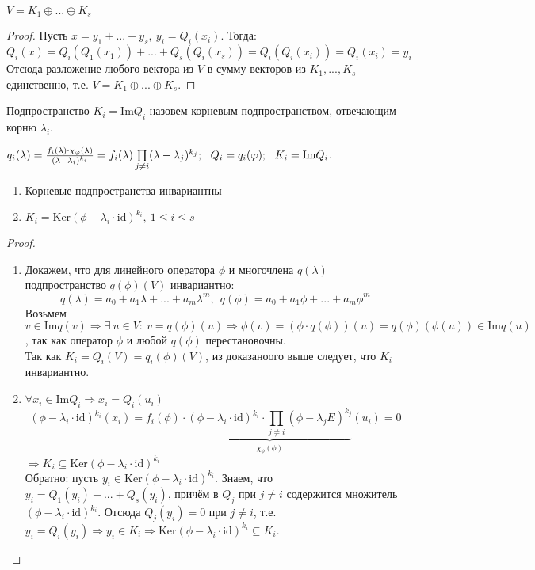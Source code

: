     \begin{subtheorem}
        $V = K_1 \oplus ... \oplus K_s$
    \end{subtheorem}
    \begin{proof}
        Пусть $x = y_1 + ... + y_s, \ y_i = Q_i(x_i)$. Тогда:
        $$Q_i(x) = Q_i(Q_1(x_1)) + ... + Q_s(Q_i(x_s)) = Q_i(Q_i(x_i)) = Q_i(x_i) = y_i$$
        Отсюда разложение любого вектора из $V$ в сумму векторов из $K_1,...,K_s$ единственно, т.е. $V = K_1 \oplus ... \oplus K_s$.
    \end{proof}
    \begin{definition}
        Подпространство $K_i = \text{Im} Q_i$ назовем корневым подпространством, отвечающим корню $\lambda_i$.
    \end{definition}
    \begin{remark}
        $q_i(\lambda) = \frac{f_i(\lambda)\cdot \chi_\phi(\lambda)}{(\lambda-\lambda_i)^{k_i}} = f_i(\lambda)\prod\limits_{j \neq i}(\lambda-\lambda_j)^{k_j}; \ \ Q_i = q_i(\phi); \ \ K_i = \textup{Im}Q_i$.
    \end{remark} 
    \begin{subtheorem}\tab
        \begin{enumerate}
            \item Корневые подпространства инвариантны
            \item $K_i = \text{Ker} (\phi - \lambda_i\cdot \text{id})^{k_i}, \ 1\leq i \leq s$ 
        \end{enumerate}
    \end{subtheorem}
    \begin{proof}\tab 
        \begin{enumerate}
            \item Докажем, что для линейного оператора $\phi$ и многочлена $q(\lambda)$ подпространство $q(\phi)(V)$ инвариантно:
            $$q(\lambda) = a_0+ a_1 \lambda + ... + a_m \lambda^m, \ \ q(\phi) = a_0+ a_1 \phi + ... + a_m \phi^m$$
            Возьмем $v \in \text{Im}q(v) \Longrightarrow \exists \ u \in V: \ v = q(\phi)(u) \Longrightarrow \phi(v) = (\phi \cdot q(\phi))(u) = q(\phi)(\phi(u)) \in \text{Im}q(u)$, так как оператор $\phi$ и любой $q(\phi)$ перестановочны.\\
            Так как $K_i = Q_i(V) = q_i(\phi)(V)$, из доказаноого выше следует, что $K_i$ инвариантно.
            \item $\forall x_i \in \text{Im}Q_i \Longrightarrow x_i = Q_i(u_i)$
            $$(\phi-\lambda_i \cdot \text{id})^{k_i}(x_i) = f_i(\phi) \cdot \underbrace{(\phi-\lambda_i \cdot \text{id})^{k_i} \cdot \prod\limits_{j \neq i}(\phi-\lambda_j E)^{k_j}}_{\chi_\phi(\phi)}(u_i) = 0$$
            $\Longrightarrow K_i \subseteq \text{Ker}(\phi-\lambda_i \cdot \text{id})^{k_i}$\\ 
            Обратно: пусть $y_i \in \text{Ker}(\phi-\lambda_i \cdot \text{id})^{k_i}$. Знаем, что $y_i = Q_1(y_i) + ... + Q_s(y_i)$, причём в $Q_j$ при $j \neq i$ содержится множитель $(\phi-\lambda_i \cdot \text{id})^{k_i}$. Отсюда $Q_j(y_i) = 0$ при $j \neq i$, т.е. $y_i = Q_i(y_i) \Rightarrow y_i \in K_i \Rightarrow \text{Ker}(\phi-\lambda_i \cdot \text{id})^{k_i} \subseteq K_i$.
        \end{enumerate}
    \end{proof} 
